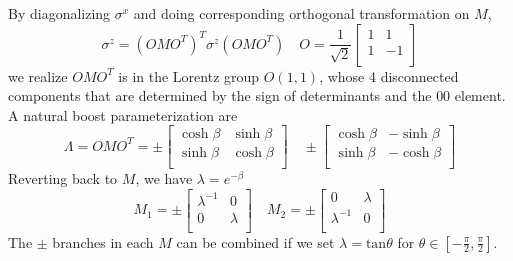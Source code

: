 \documentclass{article}
\begin{document}
By diagonalizing $\sigma^x$ and doing corresponding orthogonal transformation on $M$, 
\begin{equation}
\sigma^z = ( OMO^T  )^T \sigma^z ( OMO^T )  \quad 
O = \frac{1}{\sqrt{2}} 
\begin{bmatrix}
1 & 1 \\
1 & -1 \\                       
\end{bmatrix}
\end{equation}
we realize $O M O^T$ is in the Lorentz group $O( 1, 1 )$, whose 4 disconnected components that are determined by the sign of determinants and the $00$ element. A natural boost parameterization are 
\begin{equation} 
\Lambda = O M O^T = \pm 
\begin{bmatrix}
\cosh \beta & \sinh \beta \\
\sinh \beta & \cosh \beta \\  
\end{bmatrix}
\quad \pm 
\begin{bmatrix}
\cosh \beta & -\sinh \beta \\
\sinh \beta & -\cosh \beta \\  
\end{bmatrix}
\end{equation}
Reverting back to $M$, we have $\lambda = e^{-\beta}$
\begin{equation}
M_1 = \pm 
\begin{bmatrix}
\lambda^{-1} & 0 \\
0 & \lambda \\
\end{bmatrix}
\quad 
M_2 = \pm 
\begin{bmatrix}
0 & \lambda\\
\lambda^{-1} & 0 \\
\end{bmatrix}
\end{equation}
The $\pm$ branches in each $M$ can be combined if we set $\lambda = \text{tan} \theta$ for $\theta \in [- \frac{\pi}{2}, \frac{\pi}{2} ] $.
\end{document}
